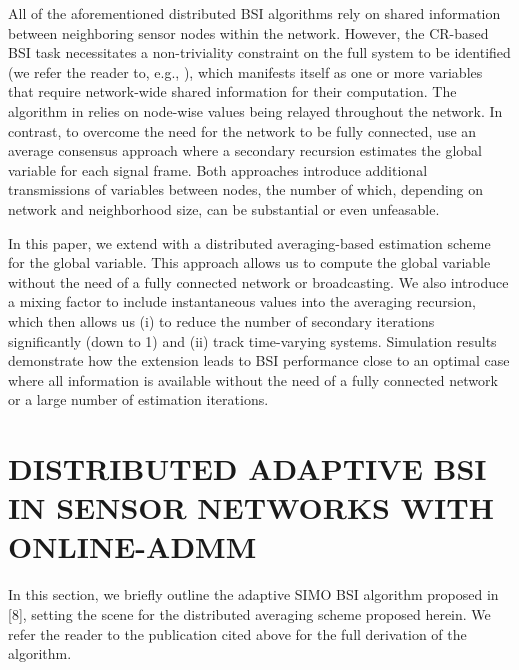 \documentclass{article}
\begin{document}
All of the aforementioned distributed BSI algorithms rely on shared information between neighboring sensor nodes within the network.
However, the CR-based BSI task necessitates a non-triviality constraint on the full system to be identified (we refer the reader to, e.g., \cite{huangAdaptiveMultichannelLeast2002,huangClassFrequencydomainAdaptive2003}), which manifests itself as one or more variables that require network-wide shared information for their computation.
The algorithm in \cite{blochbergerDBSI} relies on node-wise values being relayed throughout the network.
In contrast, to overcome the need for the network to be fully connected, \cite{yuDistributedBlindSystem2014, liuDistributedBlindIdentification2016} use an average consensus \cite{xiaoFastLinearIterations2004} approach where a secondary recursion estimates the global variable for each signal frame.
Both approaches introduce additional transmissions of variables between nodes, the number of which, depending on network and neighborhood size, can be substantial or even unfeasable.

In this paper, we extend \cite{blochbergerDBSI} with a distributed averaging-based \cite{xiaoFastLinearIterations2004} estimation scheme for the global variable.
This approach allows us to compute the global variable without the need of a fully connected network or broadcasting.
We also introduce a mixing factor to include instantaneous values into the averaging recursion, which then allows us (i) to reduce the number of secondary iterations significantly (down to 1) and (ii) track time-varying systems.
Simulation results demonstrate how the extension leads to BSI performance close to an optimal case where all information is available without the need of a fully connected network or a large number of estimation iterations.

\section{DISTRIBUTED ADAPTIVE BSI IN SENSOR NETWORKS WITH ONLINE-ADMM}
\label{sec:dbsi}
In this section, we briefly outline the adaptive SIMO BSI algorithm proposed in [8], setting the scene for the distributed averaging scheme proposed herein.
We refer the reader to the publication cited above for the full derivation of the algorithm.
\end{document}
